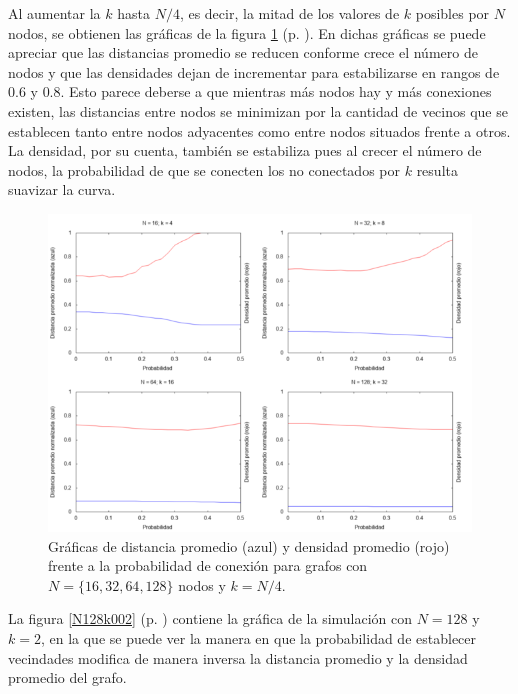\documentclass{article}
\begin{document}
  Al aumentar la $k$ hasta $N / 4$, es decir, la mitad de los valores de $k$ posibles por $N$ nodos, se obtienen las gráficas de la figura \ref{ejemplokMedia} (p. \pageref{ejemplokMedia}). En dichas gráficas se puede apreciar que las distancias promedio se reducen conforme crece el número de nodos y que las densidades dejan de incrementar para estabilizarse en rangos de $0.6$ y $0.8$. Esto parece deberse a que mientras más nodos hay y más conexiones existen, las distancias entre nodos se minimizan por la cantidad de vecinos que se establecen tanto entre nodos adyacentes como entre nodos situados frente a otros. La densidad, por su cuenta, también se estabiliza pues al crecer el número de nodos, la probabilidad de que se conecten los no conectados por $k$ resulta suavizar la curva.

  \begin{figure}[h]
    \includegraphics[width=1\textwidth]{ejemplokMedia}
    \centering
    \caption{Gráficas de distancia promedio (azul) y densidad promedio (rojo) frente a la probabilidad de conexión para grafos con $N = \{ 16, 32, 64, 128 \} $ nodos y $k = N / 4$.}
    \label{ejemplokMedia}
  \end{figure}

  La figura \ref{N128k002} (p. \pageref{N128k002}) contiene la gráfica de la simulación con $N = 128$ y $k = 2$, en la que se puede ver la manera en que la probabilidad de establecer vecindades modifica de manera inversa la distancia promedio y la densidad promedio del grafo.
\end{document}
